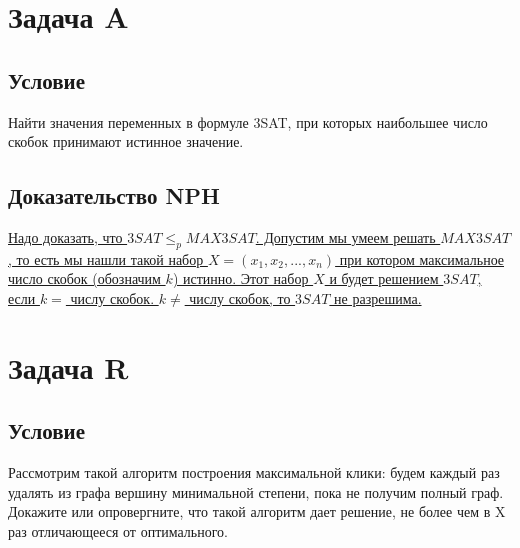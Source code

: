 \documentclass{article}
\begin{document}
\section*{Задача A} 

\subsection*{Условие} 
Найти значения переменных в формуле 3SAT, при которых наибольшее число
скобок принимают истинное значение.

\subsection*{Доказательство NPH}
\uline{Надо доказать, что $3SAT \leq_p MAX3SAT$.  Допустим мы умеем решать $MAX3SAT$, то есть мы нашли такой набор $X = (x_1, x_2, ..., x_n)$ при котором максимальное число скобок (обозначим $k$) истинно. Этот набор $X$ и будет решением $3SAT$, если $k =$ числу скобок. $k \neq$ числу скобок, то $3SAT$ не разрешима.}

\newpage
\section*{Задача  R} 

\subsection*{Условие} 
Рассмотрим такой алгоритм построения максимальной клики: будем каждый раз
удалять из графа вершину минимальной степени, пока не получим полный граф.
Докажите или опровергните, что такой алгоритм дает решение, не более чем в X
раз отличающееся от оптимального.
\end{document}
